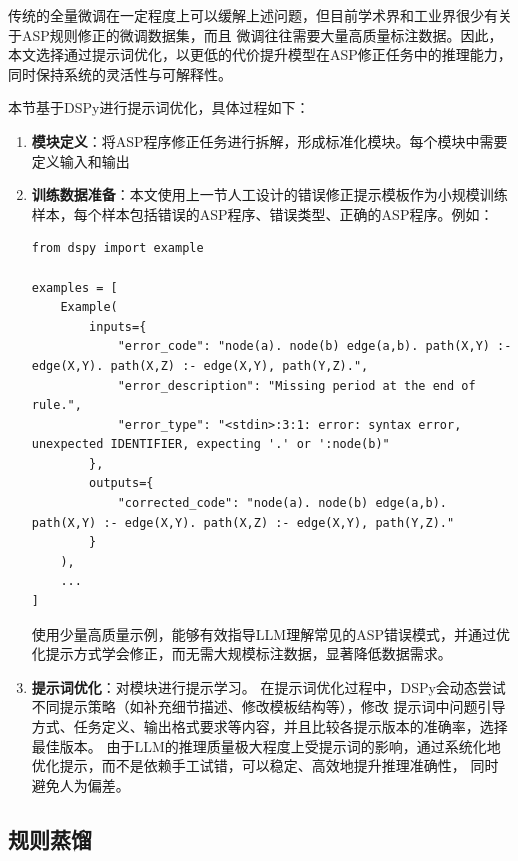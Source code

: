 传统的全量微调在一定程度上可以缓解上述问题，但目前学术界和工业界很少有关于ASP规则修正的微调数据集，而且
微调往往需要大量高质量标注数据。因此，本文选择通过提示词优化，以更低的代价提升模型在ASP修正任务中的推理能力，同时保持系统的灵活性与可解释性。

本节基于DSPy进行提示词优化，具体过程如下：
\begin{enumerate}[nosep]
\item \textbf{模块定义}：将ASP程序修正任务进行拆解，形成标准化模块。每个模块中需要定义输入和输出
\item \textbf{训练数据准备}：本文使用上一节人工设计的错误修正提示模板作为小规模训练样本，每个样本包括错误的ASP程序、错误类型、正确的ASP程序。例如：
\begin{lstlisting}
from dspy import example

examples = [
    Example(
        inputs={
            "error_code": "node(a). node(b) edge(a,b). path(X,Y) :- edge(X,Y). path(X,Z) :- edge(X,Y), path(Y,Z).",
            "error_description": "Missing period at the end of rule.",
            "error_type": "<stdin>:3:1: error: syntax error, unexpected IDENTIFIER, expecting '.' or ':node(b)"
        },
        outputs={
            "corrected_code": "node(a). node(b) edge(a,b). path(X,Y) :- edge(X,Y). path(X,Z) :- edge(X,Y), path(Y,Z)."
        }
    ),
    ...
]
\end{lstlisting}
使用少量高质量示例，能够有效指导LLM理解常见的ASP错误模式，并通过优化提示方式学会修正，而无需大规模标注数据，显著降低数据需求。
\item \textbf{提示词优化}：对模块进行提示学习。
在提示词优化过程中，DSPy会动态尝试不同提示策略（如补充细节描述、修改模板结构等），修改
提示词中问题引导方式、任务定义、输出格式要求等内容，并且比较各提示版本的准确率，选择最佳版本。
由于LLM的推理质量极大程度上受提示词的影响，通过系统化地优化提示，而不是依赖手工试错，可以稳定、高效地提升推理准确性，
同时避免人为偏差。
\end{enumerate}
\subsection{规则蒸馏}

